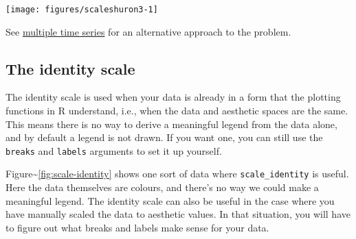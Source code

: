 \begin{Shaded}
\begin{Highlighting}[]
\NormalTok{>}\StringTok{ }
\NormalTok{+}\StringTok{   }\NormalTok{(}\NormalTok{(} \StringTok{ }\NormalTok{, } \NormalTok{)) +}\StringTok{ }
\NormalTok{+}\StringTok{   }\NormalTok{(}\NormalTok{(} \StringTok{ }\NormalTok{, } \NormalTok{)) +}\StringTok{ }
\NormalTok{+}\StringTok{   }\NormalTok{(}\NormalTok{, }
\NormalTok{+}\StringTok{                       }\NormalTok{(} \NormalTok{=}\NormalTok{, } \NormalTok{=}\NormalTok{))}
\end{Highlighting}
\end{Shaded}

\texttt{[image: figures/scaleshuron3-1]}

See \hyperref[sub:time-series]{multiple time series} for an alternative
approach to the problem.

\subsection{The identity scale}\label{sub:scale-identity}

The identity scale is used when your data is already in a form that the
plotting functions in R understand, i.e., when the data and aesthetic
spaces are the same. This means there is no way to derive a meaningful
legend from the data alone, and by default a legend is not drawn. If you
want one, you can still use the \texttt{breaks} and \texttt{labels}
arguments to set it up yourself. 

Figure\textasciitilde{}\ref{fig:scale-identity} shows one sort of data
where \texttt{scale\_identity} is useful. Here the data themselves are
colours, and there's no way we could make a meaningful legend. The
identity scale can also be useful in the case where you have manually
scaled the data to aesthetic values. In that situation, you will have to
figure out what breaks and labels make sense for your data.

